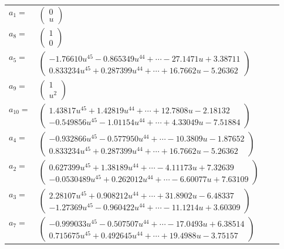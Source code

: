 \documentclass[1p]{elsarticle_modified}
\theoremstyle{definition}
\begin{document}
\begin{tabular}{m{7pt} m{180pt} m{7pt} m{180pt} }
\flushright $a_{1}=$&$\begin{pmatrix}0\\u\end{pmatrix}$ \\
\flushright $a_{8}=$&$\begin{pmatrix}1\\0\end{pmatrix}$ \\
\flushright $a_{5}=$&$\begin{pmatrix}-1.76610 u^{45}-0.865349 u^{44}+\cdots-27.1471 u+3.38711\\0.833234 u^{45}+0.287399 u^{44}+\cdots+16.7662 u-5.26362\end{pmatrix}$ \\
\flushright $a_{9}=$&$\begin{pmatrix}1\\u^2\end{pmatrix}$ \\
\flushright $a_{10}=$&$\begin{pmatrix}1.43817 u^{45}+1.42819 u^{44}+\cdots+12.7808 u-2.18132\\-0.549856 u^{45}-1.01154 u^{44}+\cdots+4.33049 u-7.51884\end{pmatrix}$ \\
\flushright $a_{4}=$&$\begin{pmatrix}-0.932866 u^{45}-0.577950 u^{44}+\cdots-10.3809 u-1.87652\\0.833234 u^{45}+0.287399 u^{44}+\cdots+16.7662 u-5.26362\end{pmatrix}$ \\
\flushright $a_{2}=$&$\begin{pmatrix}0.627399 u^{45}+1.38189 u^{44}+\cdots-4.11173 u+7.32639\\-0.0530489 u^{45}+0.262012 u^{44}+\cdots-6.60077 u+7.63109\end{pmatrix}$ \\
\flushright $a_{3}=$&$\begin{pmatrix}2.28107 u^{45}+0.908212 u^{44}+\cdots+31.8902 u-6.48337\\-1.27369 u^{45}-0.960422 u^{44}+\cdots-11.1214 u+3.60309\end{pmatrix}$ \\
\flushright $a_{7}=$&$\begin{pmatrix}-0.999033 u^{45}-0.507507 u^{44}+\cdots-17.0493 u+6.38514\\0.715675 u^{45}+0.492645 u^{44}+\cdots+19.4988 u-3.75157\end{pmatrix}$ \\

\end{tabular}
\end{document}
